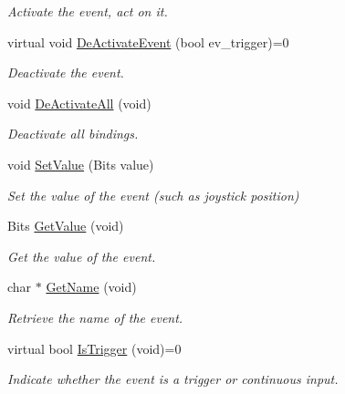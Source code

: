 \begin{DoxyCompactItemize}
\begin{DoxyCompactList}\small\item\em Activate the event, act on it. \end{DoxyCompactList}\item 
\hypertarget{classCEvent_a525574fb193f9e50402a8fd5028b9b06}{virtual void \hyperlink{classCEvent_a525574fb193f9e50402a8fd5028b9b06}{De\-Activate\-Event} (bool ev\-\_\-trigger)=0}\label{classCEvent_a525574fb193f9e50402a8fd5028b9b06}

\begin{DoxyCompactList}\small\item\em Deactivate the event. \end{DoxyCompactList}\item 
\hypertarget{classCEvent_a633d83fd6d210a7b6a517754548eee11}{void \hyperlink{classCEvent_a633d83fd6d210a7b6a517754548eee11}{De\-Activate\-All} (void)}\label{classCEvent_a633d83fd6d210a7b6a517754548eee11}

\begin{DoxyCompactList}\small\item\em Deactivate all bindings. \end{DoxyCompactList}\item 
\hypertarget{classCEvent_aaa253031798af461119b830d079e8225}{void \hyperlink{classCEvent_aaa253031798af461119b830d079e8225}{Set\-Value} (Bits value)}\label{classCEvent_aaa253031798af461119b830d079e8225}

\begin{DoxyCompactList}\small\item\em Set the value of the event (such as joystick position) \end{DoxyCompactList}\item 
\hypertarget{classCEvent_ad4e49c2aa32efecdc91c9439e858b940}{Bits \hyperlink{classCEvent_ad4e49c2aa32efecdc91c9439e858b940}{Get\-Value} (void)}\label{classCEvent_ad4e49c2aa32efecdc91c9439e858b940}

\begin{DoxyCompactList}\small\item\em Get the value of the event. \end{DoxyCompactList}\item 
\hypertarget{classCEvent_a4693b4e54c079cc97f0522eb15154953}{char $\ast$ \hyperlink{classCEvent_a4693b4e54c079cc97f0522eb15154953}{Get\-Name} (void)}\label{classCEvent_a4693b4e54c079cc97f0522eb15154953}

\begin{DoxyCompactList}\small\item\em Retrieve the name of the event. \end{DoxyCompactList}\item 
\hypertarget{classCEvent_affd064f43309b5fc4966edb36935723d}{virtual bool \hyperlink{classCEvent_affd064f43309b5fc4966edb36935723d}{Is\-Trigger} (void)=0}\label{classCEvent_affd064f43309b5fc4966edb36935723d}

\begin{DoxyCompactList}\small\item\em Indicate whether the event is a trigger or continuous input. \end{DoxyCompactList}\end{DoxyCompactItemize}
